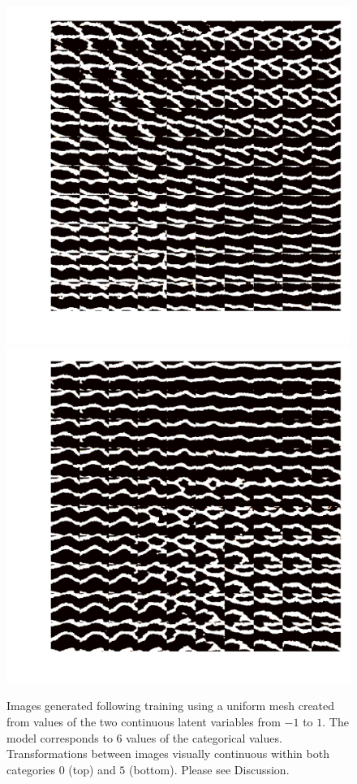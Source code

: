 \documentclass{article}
\begin{document}
\begin{figure}[h]
\centering
  \includegraphics[width=\textwidth,scale=0.2]{figures/samples_zk_0.png}
  \includegraphics[width=\textwidth,scale=0.2]{figures/samples_zk_5.png}
  \caption{Images generated following training using a uniform mesh created from values of the  two continuous latent variables from $-1$ to $1$.  The model corresponds to $6$ values of the categorical values.  Transformations between images visually continuous within both categories $0$ (top) and $5$ (bottom). Please see Discussion.}
\end{figure}\label{cat6samples}
\end{document}
